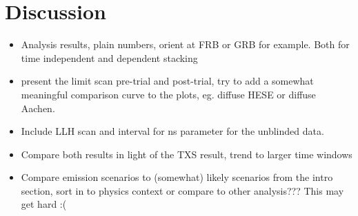 \chapter{Discussion}

\begin{itemize}
  \item Analysis results, plain numbers, orient at FRB or GRB for example.
  Both for time independent and dependent stacking
  \item present the limit scan pre-trial and post-trial, try to add a somewhat meaningful comparison curve to the plots, eg. diffuse HESE or diffuse Aachen.
  \item Include LLH scan and interval for ns parameter for the unblinded data.
  \item Compare both results in light of the TXS result, trend to larger time windows
  \item Compare emission scenarios to (somewhat) likely scenarios from the intro section, sort in to physics context or compare to other analysis???
  This may get hard :(
\end{itemize}


